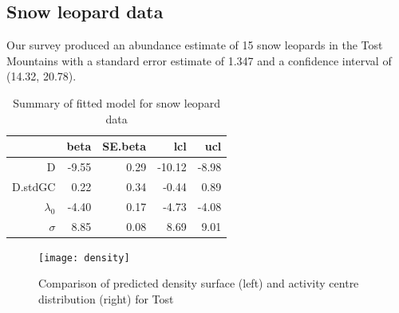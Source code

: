 \documentclass[a4paper,12pt]{article}
\begin{document}


\subsection{Snow leopard data}

Our survey produced an abundance estimate of 15 snow leopards in the Tost Mountains with a standard error estimate of 1.347 and a confidence interval of (14.32, 20.78).

\begin{table}[ht]
\centering
\begin{tabular}{rrrrr}
  \hline
 & beta & SE.beta & lcl & ucl \\ 
  \hline
D & -9.55 & 0.29 & -10.12 & -8.98 \\ 
  D.stdGC & 0.22 & 0.34 & -0.44 & 0.89 \\ 
  $\lambda_0$ & -4.40 & 0.17 & -4.73 & -4.08 \\ 
  $\sigma$ & 8.85 & 0.08 & 8.69 & 9.01 \\ 
   \hline
\end{tabular}
\caption{Summary of fitted model for snow leopard data}
\end{table}

\begin{figure}[H]
\centering
\texttt{[image: density]}
\caption{Comparison of predicted density surface (left) and activity centre distribution (right) for Tost}
\label{tostdensity}
\end{figure}
\end{document}
